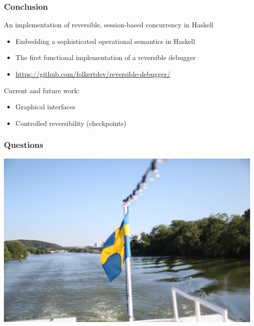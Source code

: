 \documentclass[12pt]{beamer}
\begin{document}
\begin{frame}[fragile]
\frametitle{Conclusion}

An implementation of reversible, session-based concurrency in Haskell
\begin{itemize}
    \item Embedding a sophisticated operational semantics in Haskell
    \item The first functional implementation of a reversible debugger
    \item \url{https://github.com/folkertdev/reversible-debugger/}
\end{itemize}

\smallskip

Current and future work:
\begin{itemize}
    \item Graphical interfaces
    \item Controlled reversibility (checkpoints)
\end{itemize}

\end{frame}

\begin{frame}[t]
\frametitle{Questions}
\begin{center}
\includegraphics[scale=0.06]{img/gothenburg-cruise.JPG}
\end{center}
\end{frame}
    
\end{document}
